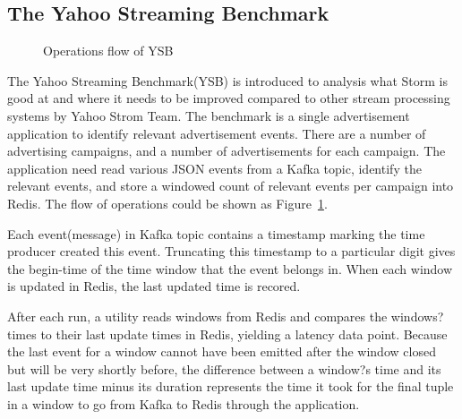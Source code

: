 \subsection{The Yahoo Streaming Benchmark}
\begin{figure}
  \begin{center}
   \caption{Operations flow of YSB \cite{YSB}}
   \label{fig:yahoo_stream_bench}
  \end{center}
\end{figure}


The Yahoo Streaming Benchmark(YSB) is introduced to analysis what Storm is good at and where it needs to be improved compared to other stream processing systems by Yahoo Strom Team. \cite{YSB} The benchmark is a single advertisement application to identify relevant advertisement events. There are a number of advertising campaigns, and a number of advertisements for each campaign. The application need read various JSON events from a Kafka topic, identify the relevant events, and store a windowed count of relevant events per campaign into Redis. The flow of operations could be shown as Figure~\ref{fig:yahoo_stream_bench}.

Each event(message) in Kafka topic contains a timestamp marking the time producer created this event. Truncating this timestamp to a particular digit gives the begin-time of the time window that the event belongs in. When each window is updated in Redis, the last updated time is recored.

After each run, a utility reads windows from Redis and compares the windows? times to their last update times in Redis, yielding a latency data point. Because the last event for a window cannot have been emitted after the window closed but will be very shortly before, the difference between a window?s time and its last update time minus its duration represents the time it took for the final tuple in a window to go from Kafka to Redis through the application. \\

